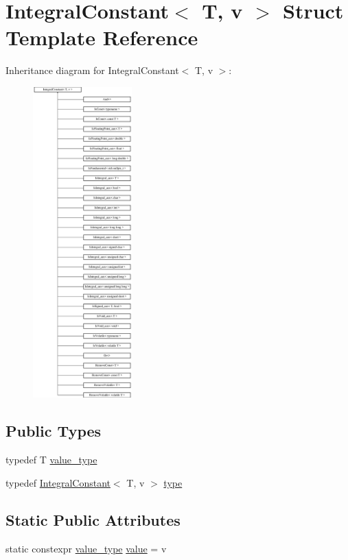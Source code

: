 \hypertarget{struct_integral_constant}{}\section{Integral\+Constant$<$ T, v $>$ Struct Template Reference}
\label{struct_integral_constant}
Inheritance diagram for Integral\+Constant$<$ T, v $>$\+:\begin{figure}[H]
\begin{center}
\leavevmode
\includegraphics[height=12.000000cm]{struct_integral_constant}
\end{center}
\end{figure}
\subsection*{Public Types}
\begin{DoxyCompactItemize}
\item 
typedef T \hyperlink{struct_integral_constant_ad3b4a206c2b1ba8147a1b0d100c207c8}{value\+\_\+type}
\item 
typedef \hyperlink{struct_integral_constant}{Integral\+Constant}$<$ T, v $>$ \hyperlink{struct_integral_constant_a7ba94a7b81411756fdb000c74badc6a1}{type}
\end{DoxyCompactItemize}
\subsection*{Static Public Attributes}
\begin{DoxyCompactItemize}
\item 
static constexpr \hyperlink{struct_integral_constant_ad3b4a206c2b1ba8147a1b0d100c207c8}{value\+\_\+type} \hyperlink{struct_integral_constant_aa2b0f56577a860c583f2a82e36810237}{value} = v
\end{DoxyCompactItemize}


